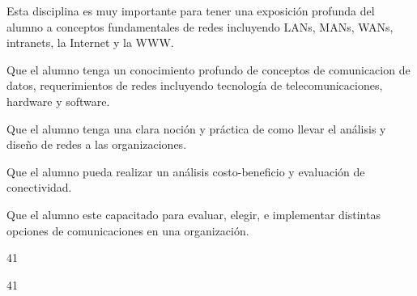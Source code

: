 \begin{syllabus}


\begin{justification}
Esta disciplina es muy importante para tener una exposición profunda del alumno a conceptos fundamentales de redes incluyendo LANs, MANs, WANs, intranets, la Internet y la WWW.
\end{justification}

\begin{goals}
\item Que el alumno tenga un conocimiento profundo de conceptos de comunicacion de datos, requerimientos de redes incluyendo tecnología de telecomunicaciones, hardware y software.
\item Que el alumno tenga una clara noción y práctica de como llevar el análisis y diseño de redes a las organizaciones.
\item Que el alumno pueda realizar un análisis costo-beneficio y evaluación de conectividad.
\item Que el alumno este capacitado para evaluar, elegir, e implementar distintas opciones de comunicaciones en una organización.
\end{goals}

\begin{outcomes}
\end{outcomes}

\begin{unit}{\LUTHREETWODef}{\LUTHREETWOBib}{4}{1}
   \begin{topics}
			\item \ITFIVETopicONExFIVExTWO
			\item \ITFIVETopicONExFIVExFOUR
			\item \ITFIVETopicONExFIVExSIX
   \end{topics}
	\LUTHREETWOGoal
\end{unit}

\begin{unit}{\LUTHREETHREEDef}{\LUTHREETHREEBib}{4}{1}
   \begin{topics}
	\item \ITONETopicONExONExONE
	\begin{subtopics}
		\item \ITONETopicONExONExONExONE
	\end{subtopics}
	\item \ITONETopicONExONExFIVE
	\item \ITFIVETopicONExFIVExONETWO
	\item \ITFIVETopicONExFIVExEIGHT
	\item \OMCONETopicTWOxONExTWO
	\item \OMCONETopicTWOxONExTHREE
	\item \OMCTHREETopicTWOxTHREExFOUR
   \end{topics}
	\LUTHREETHREEGoal
\end{unit}


\end{syllabus}

